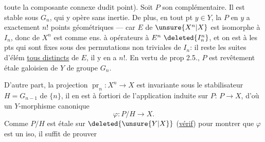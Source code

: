 toute la composante connexe dudit point).
Soit $P$ son complémentaire. Il est  stable sous $G_n$, qui y opère sans inertie.
De plus, en tout pt $y\in Y$, la  $P$ en $y$ a exactement $n!$ points géométriques --- car   $E$ de $\unsure{X^n|X}$ est isomorphe à $I_n$, donc  de $X^n$ est  comme ens. à opérateurs à $E^n\ \deleted{I_n^n}$, et on est à  les pts qui sont fixes sous des permutations non triviales de $I_n$: il reste les suites d'élém \uline{tous distincts} de $E$, il y en a $n!$.
En vertu de prop 2.5., $P$ est  revêtement étale galoisien de $Y$ de groupe $G_n$.

D'autre part,  la  projection
$\operatorname{pr}_n:X^n\to X$  est invariante sous le stabilisateur $H=G_{n-1}$ de $\{n\}$,  il en est à fortiori de l'application induite sur $P$: $P\to X$, d'où un  $Y$-morphisme canonique
\[
\varphi:P/H\longrightarrow X.
\]
Comme $P/H$ est étale sur $\deleted{\unsure{Y|X}}$ (\uline{vérif})  pour montrer que $\varphi$ est un iso, il suffit de prouver
